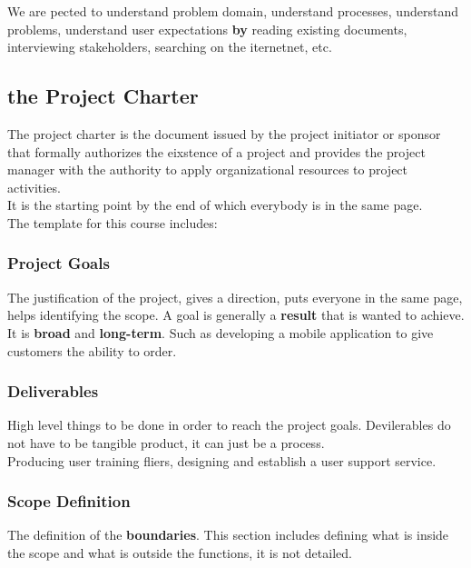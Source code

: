 \documentclass[11pt,a4paper,twocolumn]{book}
\begin{document}
We are pected to understand problem domain, understand processes, understand problems, understand user expectations \textbf{by} reading existing documents, interviewing stakeholders, searching on the iternetnet, etc.

\subsection{the Project Charter}

The project charter is the document issued by the project initiator or sponsor that formally authorizes the eixstence of a project and provides the project manager with the authority to apply organizational resources to project activities.\\

It is the starting point by the end of which everybody is in the same page.\\

The template for this course includes:

\subsubsection{Project Goals}

The justification of the project, gives a direction, puts everyone in the same page, helps identifying the scope. A goal is generally a \textbf{result} that is wanted to achieve.\\

It is \textbf{broad} and \textbf{long-term}. Such as developing a mobile application to give customers the ability to order.

\subsubsection{Deliverables}

High level things to be done in order to reach the project goals. Devilerables do not have to be tangible product, it can just be a process.\\

Producing user training fliers, designing and establish a user support service.\\

\subsubsection{Scope Definition}

The definition of the \textbf{boundaries}. This section includes defining what is inside the scope and what is outside the functions, it is not detailed.
\end{document}
